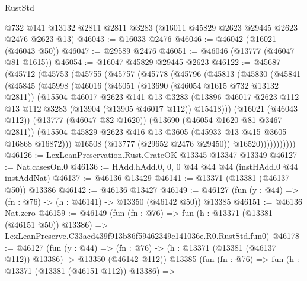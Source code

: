 \begin{lexlean}{RustStd}
\begin{coremodule}
    @732
    @141
    @13132
    @2811
    @2811
    @3283
    (@16011 @45829 @2623 @29445 @2623 @2476 @2623 @13)
@46043 := @16033 @2476
@46046 := @46042 (@16021 (@46043 @50))
@46047 := @29589 @2476
@46051 := @46046 (@13777 (@46047 @81 @1615))
@46054 := @16047 @45829 @29445 @2623
@46122 := @45687
    (@45712
      (@45753
        (@45755
          (@45757
            (@45778
              (@45796
                (@45813
                  (@45830
                    (@45841
                      (@45845
                        (@45998
                          (@46016
                            (@46051
                              (@13690 (@46054 @1615 @732 @13132 @2811))
                              (@15504
                                @46017
                                @2623
                                @141
                                @13
                                @3283
                                (@13896
                                  @46017
                                  @2623
                                  @112
                                  @13
                                  @112
                                  @3283
                                  (@13904 (@13905 @46017 @112))
                                  @15418)))
                            (@16021 (@46043 @112))
                            (@13777 (@46047 @82 @1620))
                            (@13690 (@46054 @1620 @81 @3467 @2811))
                            (@15504
                              @45829
                              @2623
                              @416
                              @13
                              @3605
                              (@45933 @13 @415 @3605 @16868 @16872)))
                          @16508
                          (@13777 (@29652 @2476 @29450))
                          @16520)))))))))))
@46126 := LexLeanPreservation.Rust.CrateOK @13345 @13347 @13349
@46127 := Nat.casesOn.{0}
@46136 := HAdd.hAdd.{0, 0, 0} @44 @44 @44 (instHAdd.{0} @44 instAddNat)
@46137 := @46136 @13429
@46141 := @13371 (@13381 (@46137 @50)) @13386
@46142 := @46136 @13427
@46149 := @46127 (fun (y : @44) => (fn : @76) -> (h : @46141) -> @13350 (@46142 @50)) @13385
@46151 := @46136 Nat.zero
@46159 := @46149
    (fun (fn : @76) =>
    fun (h : @13371 (@13381 (@46151 @50)) @13386) =>
    LexLeanPreserve.C33acd439f913b86f59462349c141036e.R0.RustStd.fun0)
@46178 := @46127
    (fun (y : @44) =>
    (fn : @76) -> (h : @13371 (@13381 (@46137 @112)) @13386) -> @13350 (@46142 @112))
    @13385
    (fun (fn : @76) =>
    fun (h : @13371 (@13381 (@46151 @112)) @13386) =>

\end{coremodule}
\end{lexlean}

